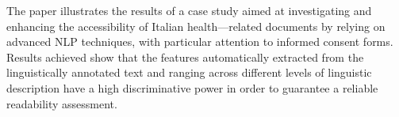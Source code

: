 The paper illustrates the results of a case study aimed at investigating and enhancing the accessibility of Italian health---related documents by relying on advanced NLP techniques, with particular attention to informed consent forms. Results achieved show that the features automatically extracted from the linguistically annotated text and ranging across different levels of linguistic description have a high discriminative power in order to guarantee a reliable readability assessment.

